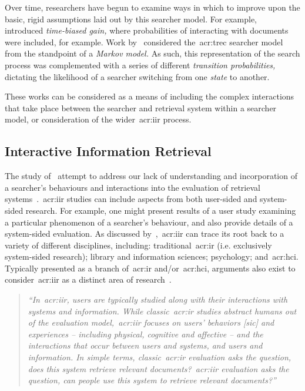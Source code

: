 Over time, researchers have begun to examine ways in which to improve upon the basic, rigid assumptions laid out by this searcher model. For example,~\cite{smucker2012tbg} introduced \emph{time-biased gain,} where probabilities of interacting with documents were included, for example. Work by~\cite{tran2017markov_models} considered the~\gls{acr:trec} searcher model from the standpoint of a \emph{Markov model.} As such, this representation of the search process was complemented with a series of different \emph{transition probabilities,} dictating the likelihood of a searcher switching from one \emph{state} to another.

These works can be considered as a means of including the complex interactions that take place between the searcher and retrieval system within a searcher model, or consideration of the wider~\gls{acr:iir} process.

\subsection{Interactive Information Retrieval}\label{sec:ir_background:user:iir}
The study of~ attempt to address our lack of understanding and incorporation of a searcher's behaviours and interactions into the evaluation of retrieval systems~\citep{callan2007minds}.~\gls{acr:iir} studies can include aspects from both user-sided and system-sided research. For example, one might present results of a user study examining a particular phenomenon of a searcher's behaviour, and also provide details of a system-sided evaluation. As discussed by~\cite{kelly2009iir},~\gls{acr:iir} can trace its root back to a variety of different disciplines, including: traditional~\gls{acr:ir} (i.e. exclusively system-sided research); library and information sciences; psychology; and~\gls{acr:hci}. Typically presented as a branch of~\gls{acr:ir} and/or~\gls{acr:hci}, arguments also exist to consider~\gls{acr:iir} as a distinct area of research~\citep{ruthven2008iir}.

\begin{quote}
\emph{``In~\gls{acr:iir}, users are typically studied along with their interactions with systems and information. While classic~\gls{acr:ir} studies abstract humans out of the evaluation model,~\gls{acr:iir} focuses on users' behaviors [sic] and experiences -- including physical, cognitive and affective -- and the interactions that occur between users and systems, and users and information. In simple terms, classic~\gls{acr:ir} evaluation asks the question, does this system retrieve relevant documents?~\gls{acr:iir} evaluation asks the question, can people use this system to retrieve relevant documents?''}
\end{quote}

